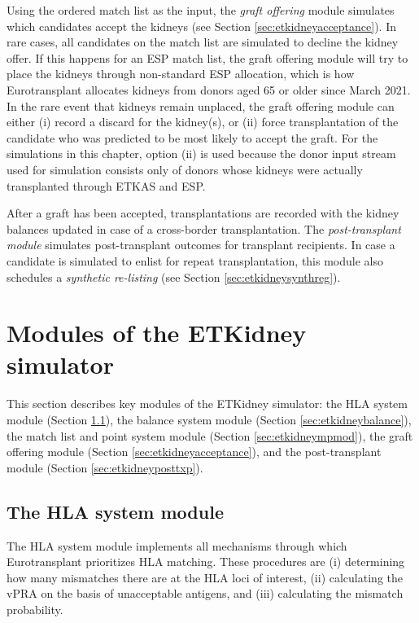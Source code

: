 \documentclass[11pt,twoside,]{book}
\begin{document}
Using the ordered match list as the input, the \emph{graft offering} module simulates
which candidates accept the kidneys (see Section
\ref{sec:etkidneyacceptance}). In rare cases, all candidates on the match list
are simulated to decline the kidney offer. If this
happens for an ESP match list, the graft offering module will
try to place the kidneys through non-standard ESP allocation, which is
how Eurotransplant allocates kidneys from donors aged 65 or older since
March 2021. In the rare event that kidneys remain unplaced, the graft offering module
can either (i) record a discard for the kidney(s), or (ii) force transplantation of the
candidate who was predicted to be most likely to accept the graft.
For the simulations in this chapter, option (ii) is used because
the donor input stream used for simulation consists only of donors whose
kidneys were actually transplanted through ETKAS and ESP.

After a graft has been accepted, transplantations are recorded with the
kidney balances updated in case of a cross-border transplantation.
The \emph{post-transplant module} simulates post-transplant outcomes for transplant
recipients. In case a candidate is simulated to enlist for repeat transplantation,
this module also schedules a \emph{synthetic re-listing} (see Section
\ref{sec:etkidneysynthreg}).

\section{Modules of the ETKidney simulator}\label{sec:etkidneymodules}

This section describes key modules of the ETKidney simulator: the HLA
system module (Section \ref{sec:etkidneyhla}), the balance system module
(Section \ref{sec:etkidneybalance}), the match list and point system
module (Section \ref{sec:etkidneympmod}), the graft offering
module (Section \ref{sec:etkidneyacceptance}), and the post-transplant module
(Section \ref{sec:etkidneyposttxp}).

\subsection{The HLA system module}\label{sec:etkidneyhla}

The HLA system module implements all mechanisms through which
Eurotransplant prioritizes HLA matching. These procedures are (i)
determining how many mismatches there are at the HLA loci of interest, (ii)
calculating the vPRA on the basis of unacceptable antigens, and (iii)
calculating the mismatch probability.
\end{document}
